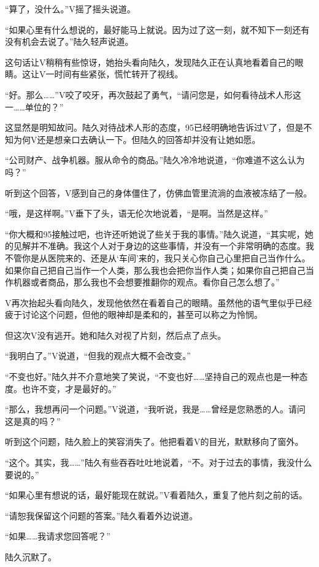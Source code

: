 “算了，没什么。”V摇了摇头说道。

“如果心里有什么想说的，最好能马上就说。因为过了这一刻，就不知下一刻还有没有机会去说了。”陆久轻声说道。

这句话让V稍稍有些惊讶，她抬头看向陆久，发现陆久正在认真地看着自己的眼睛。这让V一时间有些紧张，慌忙转开了视线。

“好。那么……”V咬了咬牙，再次鼓起了勇气，“请问您是，如何看待战术人形这一……单位的？”

这显然是明知故问。陆久对待战术人形的态度，95已经明确地告诉过V了，但是不知为何V还是想亲口去确认一下。但陆久的回答却并没有让她如愿。

“公司财产、战争机器。服从命令的商品。”陆久冷冷地说道，“你难道不这么认为吗？”

听到这个回答，V感到自己的身体僵住了，仿佛血管里流淌的血液被冻结了一般。

“哦，是这样啊。”V垂下了头，语无伦次地说着，“是啊。当然是这样。”

“你大概和95接触过吧，也许还听她说了些关于我的事情。”陆久说道，“其实呢，她的见解并不准确。我这个人对于身边的这些事情，并没有一个非常明确的态度。我不管你是从医院来的、还是从‘车间’来的，我只关心你自己心里把自己当作什么。如果你自己把自己当作一个人类，那么我也会把你当作人类；如果你自己把自己当作机器或者商品，那么我也不会想要推翻你的观点。看你自己怎么想了。”

V再次抬起头看向陆久，发现他依然在看着自己的眼睛。虽然他的语气里似乎已经疲于讨论这个问题，但他的眼神却是柔和的，甚至可以称之为怜悯。

但这次V没有逃开。她和陆久对视了片刻，然后点了点头。

“我明白了。”V说道，“但我的观点大概不会改变。”

“不变也好。”陆久并不介意地笑了笑说，“不变也好……坚持自己的观点也是一种态度。也许不变，才是最好的。”

“那么，我想再问一个问题。”V说道，“我听说，我是……曾经是您熟悉的人。请问这是真的吗？”

听到这个问题，陆久脸上的笑容消失了。他把看着V的目光，默默移向了窗外。

“这个。其实，我……”陆久有些吞吞吐吐地说着，“不。对于过去的事情，我没什么要说的。”

“如果心里有想说的话，最好能现在就说。”V看着陆久，重复了他片刻之前的话。

“请恕我保留这个问题的答案。”陆久看着外边说道。

“如果……我请求您回答呢？”

陆久沉默了。

